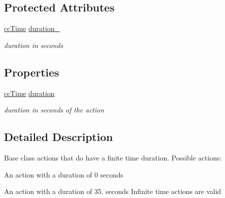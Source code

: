 \subsection*{Protected Attributes}
\begin{DoxyCompactItemize}
\item 
\hypertarget{interface_c_c_finite_time_action_a890461e18c6786dbcaf3bb7933bdcc3d}{\hyperlink{cc_types_8h_ae6c674aac4bfb46a4e6cb1e89bb66b4f}{cc\-Time} \hyperlink{interface_c_c_finite_time_action_a890461e18c6786dbcaf3bb7933bdcc3d}{duration\-\_\-}}\label{interface_c_c_finite_time_action_a890461e18c6786dbcaf3bb7933bdcc3d}

\begin{DoxyCompactList}\small\item\em duration in seconds \end{DoxyCompactList}\end{DoxyCompactItemize}
\subsection*{Properties}
\begin{DoxyCompactItemize}
\item 
\hypertarget{interface_c_c_finite_time_action_a2ae40d81bb49ccd630981aebfd37baa3}{\hyperlink{cc_types_8h_ae6c674aac4bfb46a4e6cb1e89bb66b4f}{cc\-Time} \hyperlink{interface_c_c_finite_time_action_a2ae40d81bb49ccd630981aebfd37baa3}{duration}}\label{interface_c_c_finite_time_action_a2ae40d81bb49ccd630981aebfd37baa3}

\begin{DoxyCompactList}\small\item\em duration in seconds of the action \end{DoxyCompactList}\end{DoxyCompactItemize}


\subsection{Detailed Description}
Base class actions that do have a finite time duration. Possible actions\-:
\begin{DoxyItemize}
\item An action with a duration of 0 seconds
\item An action with a duration of 35. seconds Infinite time actions are valid 
\end{DoxyItemize}


